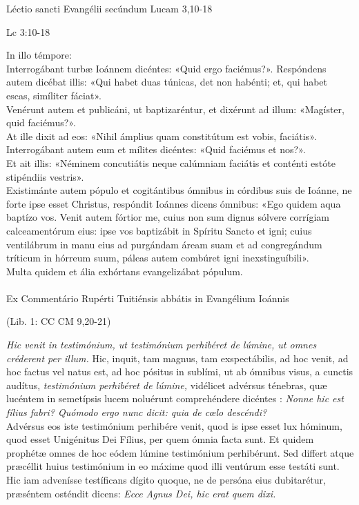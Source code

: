 \documentclass[options]{article}
\begin{document}
		Léctio sancti Evangélii secúndum Lucam 3,10-18\\
	\begin{flushright}
			Lc 3:10-18
	\end{flushright}
	In illo témpore:\\
	Interrogábant turbæ Ioánnem dicéntes: «Quid ergo faciémus?».
	Respóndens autem dicébat illis: «Qui habet duas túnicas, det non habénti; et, qui habet escas, simíliter fáciat».\\
	Venérunt autem et publicáni, ut baptizaréntur, et dixérunt ad illum: «Magíster, quid faciémus?».\\
	At ille dixit ad eos: «Nihil ámplius quam constitútum est vobis, faciátis».\\
	Interrogábant autem eum et mílites dicéntes: \emph{} «Quid faciémus et nos?».\\
	 Et ait illis: «Néminem concutiátis neque calúmniam faciátis et conténti estóte stipéndiis vestris».\\
	Existimánte autem pópulo et cogitántibus ómnibus in córdibus suis de Ioánne, ne forte ipse esset Christus, respóndit Ioánnes dicens ómnibus: «Ego quidem aqua baptízo vos. Venit autem fórtior me, cuius non sum dignus sólvere corrígiam calceamentórum eius: ipse vos baptizábit in Spíritu Sancto et igni; cuius ventilábrum in manu eius ad purgándam áream suam et ad congregándum tríticum in hórreum suum, páleas autem combúret igni inexstinguíbili».\\
	Multa quidem et ália exhórtans evangelizábat pópulum.\\
	\\
	Ex Commentário Rupérti Tuitiénsis abbátis in Evangélium Ioánnis\\
\begin{flushright}
	(Lib. 1: CC CM 9,20-21)	
\end{flushright}
	\emph{Hic venit in testimónium, ut testimónium perhibéret de lúmine, ut omnes créderent per illum.} Hic, inquit, tam magnus, tam exspectábilis, ad hoc venit, ad hoc factus vel natus est, ad hoc pósitus in sublími, ut ab ómnibus visus, a cunctis audítus, \emph{testimónium perhibéret de lúmine,} vidélicet advérsus ténebras, quæ lucéntem in semetípsis lucem noluérunt comprehéndere dicéntes : \emph{Nonne hic est fílius fabri? Quómodo ergo nunc dicit: quia de cœlo descéndi?}\\
	Advérsus eos iste testimónium perhibére venit, quod is ipse esset lux hóminum, quod esset Unigénitus Dei Fílius, per quem ómnia facta sunt. Et quidem prophétæ omnes de hoc eódem lúmine testimónium perhibérunt. Sed differt atque præcéllit huius testimónium in eo máxime quod illi ventúrum esse testáti sunt. Hic iam advenísse testíficans dígito quoque, ne de persóna eius dubitarétur, præséntem osténdit dicens: \emph{Ecce Agnus Dei, hic erat quem dixi.}\\
\end{document}
